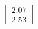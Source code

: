 \documentclass[preview]{standalone}
\begin{document}
\begin{align*}
\begin{bmatrix} 2.07 \\ 2.53 \end{bmatrix}
\end{align*}
\end{document}
